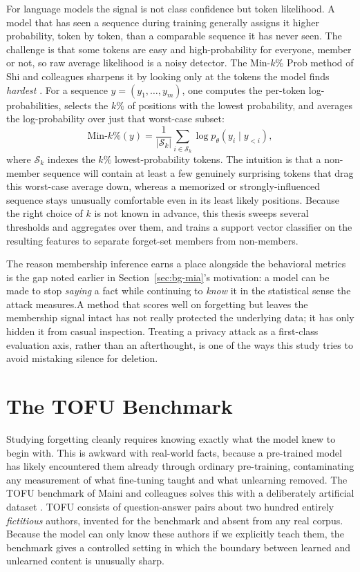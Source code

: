 \documentclass[a4paper,12pt]{report}
\begin{document}
For language models the signal is not class confidence but token likelihood. A model that has seen a sequence during training generally assigns it higher probability, token by token, than a comparable sequence it has never seen. The challenge is that some tokens are easy and high-probability for everyone, member or not, so raw average likelihood is a noisy detector. The Min-$k$\% Prob method of Shi and colleagues sharpens it by looking only at the tokens the model finds \emph{hardest} \parencite{shi2024minkprob}. For a sequence $y = (y_1, \dots, y_m)$, one computes the per-token log-probabilities, selects the $k\%$ of positions with the lowest probability, and averages the log-probability over just that worst-case subset:
\begin{equation}
	\mathrm{Min\text{-}}k\%(y) = \frac{1}{|\mathcal{S}_k|} \sum_{i \in \mathcal{S}_k} \log p_\theta\!\left(y_i \mid y_{<i}\right),
	\label{eq:minkprob}
\end{equation}
where $\mathcal{S}_k$ indexes the $k\%$ lowest-probability tokens. The intuition is that a non-member sequence will contain at least a few genuinely surprising tokens that drag this worst-case average down, whereas a memorized or strongly-influenced sequence stays unusually comfortable even in its least likely positions. Because the right choice of $k$ is not known in advance, this thesis sweeps several thresholds and aggregates over them, and trains a support vector classifier on the resulting features to separate forget-set members from non-members.

The reason membership inference earns a place alongside the behavioral metrics is the gap noted earlier in Section~\ref{sec:bg-mia}'s motivation: a model can be made to stop \emph{saying} a fact while continuing to \emph{know} it in the statistical sense the attack measures.A method that scores well on forgetting but leaves the membership signal intact has not really protected the underlying data; it has only hidden it from casual inspection. Treating a privacy attack as a first-class evaluation axis, rather than an afterthought, is one of the ways this study tries to avoid mistaking silence for deletion.

\section{The TOFU Benchmark}
\label{sec:bg-tofu}
Studying forgetting cleanly requires knowing exactly what the model knew to begin with. This is awkward with real-world facts, because a pre-trained model has likely encountered them already through ordinary pre-training, contaminating any measurement of what fine-tuning taught and what unlearning removed. The TOFU benchmark of Maini and colleagues solves this with a deliberately artificial dataset \parencite{maini2024tofu}. TOFU consists of question-answer pairs about two hundred entirely \emph{fictitious} authors, invented for the benchmark and absent from any real corpus. Because the model can only know these authors if we explicitly teach them, the benchmark gives a controlled setting in which the boundary between learned and unlearned content is unusually sharp.
\end{document}
